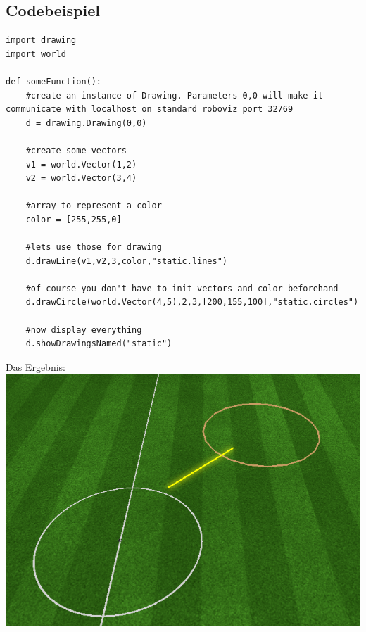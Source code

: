 \subsection*{Codebeispiel}
\begin{verbatim}import drawing
import world

def someFunction():
    #create an instance of Drawing. Parameters 0,0 will make it communicate with localhost on standard roboviz port 32769
    d = drawing.Drawing(0,0)

    #create some vectors
    v1 = world.Vector(1,2)
    v2 = world.Vector(3,4)
    
    #array to represent a color
    color = [255,255,0]

    #lets use those for drawing
    d.drawLine(v1,v2,3,color,"static.lines")

    #of course you don't have to init vectors and color beforehand
    d.drawCircle(world.Vector(4,5),2,3,[200,155,100],"static.circles")

    #now display everything
    d.showDrawingsNamed("static")
\end{verbatim}
Das Ergebnis:\\
\includegraphics[scale=0.5]{CodeBeispielDraw} 